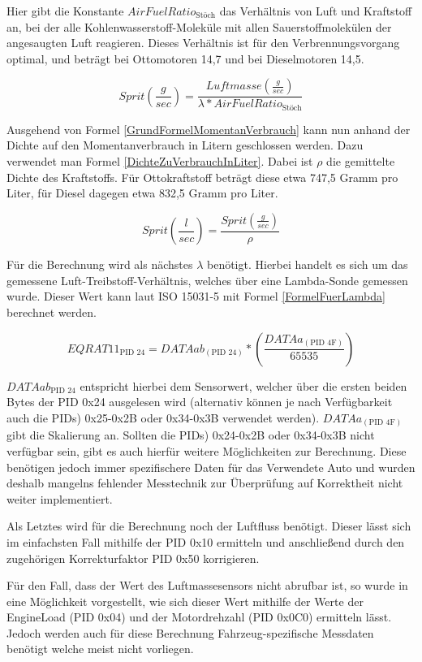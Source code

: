 Hier gibt die Konstante $AirFuelRatio_\text{Stöch}$ das Verhältnis von Luft und Kraftstoff an, bei der alle
Kohlenwasserstoff-Moleküle mit allen Sauerstoffmolekülen der angesaugten Luft reagieren. Dieses
Verhältnis ist für den Verbrennungsvorgang optimal, und beträgt bei Ottomotoren 14,7 und bei
Dieselmotoren 14,5.

\begin{equation}
\label{GrundFormelMomentanVerbrauch}
Sprit(\frac{g}{sec}) = \frac{Luftmasse(\frac{g}{sec})}{\lambda*AirFuelRatio_\text{Stöch}}
\end{equation}

Ausgehend von Formel \ref{GrundFormelMomentanVerbrauch} kann nun anhand der Dichte auf den Momentanverbrauch in Litern geschlossen werden. Dazu verwendet man Formel \ref{DichteZuVerbrauchInLiter}. Dabei ist $\rho$ die gemittelte Dichte des Kraftstoffs. Für Ottokraftstoff beträgt diese etwa 747,5
Gramm pro Liter, für Diesel dagegen etwa 832,5 Gramm pro Liter\cite{Aral2018}. 

\begin{equation}
\label{DichteZuVerbrauchInLiter}
Sprit(\frac{l}{sec}) = \frac{Sprit(\frac{g}{sec})}{\rho}
\end{equation}
 
Für die Berechnung wird als nächstes $\lambda$ benötigt. Hierbei handelt es sich um das gemessene Luft-Treibstoff-Verhältnis, welches über eine Lambda-Sonde gemessen wurde. Dieser Wert kann laut ISO 15031-5 mit Formel \ref{FormelFuerLambda} berechnet werden.

\begin{equation}
\label{FormelFuerLambda}
EQRAT 11_\text{PID 24}=DATAab_{(\text{PID 24})}*(\frac{DATAa_{(\text{PID 4F})}}{65535})
\end{equation}

$DATAab_{\text{PID 24}}$ entspricht hierbei dem Sensorwert, welcher über die ersten beiden Bytes der \ac{PID} 0x24 ausgelesen wird (alternativ können je nach Verfügbarkeit auch die \acp{PID}) 0x25-0x2B oder 0x34-0x3B verwendet werden).
\newline
$DATAa_{(\text{PID 4F})}$ gibt die Skalierung an.
\newline
Sollten die \acp{PID}) 0x24-0x2B oder 0x34-0x3B nicht verfügbar sein, gibt es auch hierfür weitere Möglichkeiten zur Berechnung. Diese benötigen jedoch immer spezifischere Daten für das Verwendete Auto und wurden deshalb mangelns fehlender Messtechnik zur Überprüfung auf Korrektheit nicht weiter implementiert.

Als Letztes wird für die Berechnung noch der Luftfluss benötigt. Dieser lässt sich im einfachsten Fall mithilfe der \ac{PID} 0x10 ermitteln und anschließend durch den zugehörigen Korrekturfaktor \ac{PID} 0x50 korrigieren.

Für den Fall, dass der Wert des Luftmassesensors nicht abrufbar ist, so wurde in \cite{obdConsumption} eine Möglichkeit vorgestellt, wie sich dieser Wert mithilfe der Werte der EngineLoad (\ac{PID} 0x04) und der Motordrehzahl (\ac{PID} 0x0C0) ermitteln lässt. Jedoch werden auch für diese Berechnung Fahrzeug-spezifische Messdaten benötigt welche meist nicht vorliegen.

 
 
 
 
